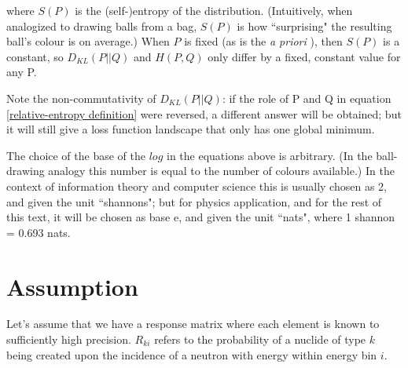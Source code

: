 \documentclass[a4paper, 12pt]{article}
\newcommand{\matr}[1]{\uuline{\bf{#1}}}
\newcommand{\apriori}[0]{\textit{a priori} }
\begin{document}
    where $S(P)$ is the (self-)entropy of the distribution.
    (Intuitively, when analogized to drawing balls from a bag, $S(P)$ is how ``surprising" the resulting ball's colour is on average.)
    When $P$ is fixed (as is the \apriori), then $S(P)$ is a constant, so $D_{KL}(P||Q)$ and $H(P,Q)$ only differ by a fixed, constant value for any P.
    
    Note the non-commutativity of $D_{KL}(P||Q)$: if the role of P and Q in equation \ref{relative-entropy definition} were reversed, a different answer will be obtained; but it will still give a loss function landscape that only has one global minimum.



    The choice of the base of the $log$ in the equations above is arbitrary. (In the ball-drawing analogy this number is equal to the number of colours available.) In the context of information theory and computer science this is usually chosen as 2, and given the unit ``shannons"; but for physics application, and for the rest of this text, it will be chosen as base e, and given the unit ``nats", where 1 shannon = 0.693 nats.
\section{Assumption}
Let's assume that we have a response matrix \matr{R} where each element is known to sufficiently high precision. $R_{ki}$ refers to the probability of a nuclide of type $k$ being created upon the incidence of a neutron with energy within energy bin $i$.
\end{document}
